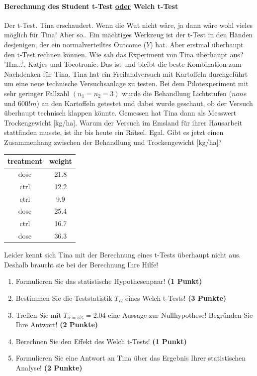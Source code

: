 \documentclass[a4paper, 9pt]{scrartcl}\usepackage[]{graphicx}\usepackage[]{xcolor}
\begin{document}
\ifcollection
\paragraph{Berechnung des Student t-Test \underline{oder} Welch t-Test}
\fi

Der t-Test. Tina erschaudert. Wenn die Wut nicht wäre, ja dann wäre wohl vieles möglich für Tina! Aber so.. Ein mächtiges Werkzeug ist der t-Test in den Händen desjenigen, der ein normalverteiltes Outcome ($Y$) hat. Aber erstmal überhaupt den t-Test rechnen können. Wie sah das Experiment von Tina überhaupt aus? 'Hm...', Katjes und Tocotronic. Das ist und bleibt die beste Kombination zum Nachdenken für Tina. Tina hat ein Freilandversuch mit Kartoffeln durchgeführt um eine neue technische Versuchsanlage zu testen. Bei dem Pilotexperiment mit sehr geringer Fallzahl $(n_1 = n_2 = 3)$ wurde die Behandlung Lichtstufen ($none$ und $600lm$) an den Kartoffeln getestet und dabei wurde geschaut, ob der Versuch überhaupt technisch klappen könnte. Gemessen hat Tina dann als Messwert Trockengewicht [kg/ha]. Warum der Versuch im Emsland für ihrer Hausarbeit stattfinden musste, ist ihr bis heute ein Rätsel. Egal. Gibt es jetzt einen Zusammenhang zwischen der Behandlung und Trockengewicht [kg/ha]?

\begin{table}[!h]
\centering
\begin{tabular}{cc}
\toprule
treatment & weight\\
\midrule
dose & 21.8\\
ctrl & 12.2\\
ctrl & 9.9\\
dose & 25.4\\
ctrl & 16.7\\
\addlinespace
dose & 36.3\\
\bottomrule
\end{tabular}
\end{table}



Leider kennt sich Tina mit der Berechnung eines t-Tests überhaupt nicht aus. Deshalb braucht sie bei der Berechnung Ihre Hilfe!

\begin{enumerate}
  \item Formulieren Sie das statistische Hypothesenpaar! \textbf{(1 Punkt)}
  \item Bestimmen Sie die Teststatistik $T_{D}$ eines Welch t-Tests! \textbf{(3 Punkte)}
  \item Treffen Sie mit $T_{\alpha = 5\%} = 2.04$ eine Aussage zur Nullhypothese! Begründen Sie Ihre Antwort! \textbf{(2 Punkte)}
  \item Berechnen Sie den Effekt des Welch t-Tests! \textbf{(1 Punkt)}
  \item Formulieren Sie eine Antwort an Tina über das Ergebnis Ihrer statistischen Analyse! \textbf{(2 Punkte)}
\end{enumerate} 
\clearpage
\end{document}
